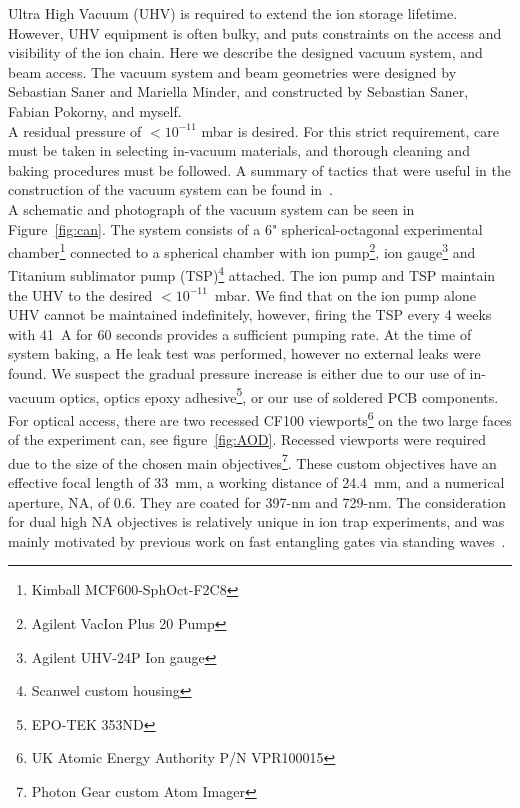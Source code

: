     Ultra High Vacuum (UHV) is required to extend the ion storage lifetime.
    However, UHV equipment is often bulky, and puts constraints on the access
    and visibility of the ion chain. Here we describe the designed vacuum
    system, and beam access.  The vacuum system and beam geometries were
    designed by Sebastian Saner and Mariella Minder, and constructed by
    Sebastian Saner, Fabian Pokorny, and myself.\\
    A residual pressure of $<10^{-11}$ mbar is desired. For this strict
    requirement, care must be taken in selecting in-vacuum materials, and 
    thorough cleaning and baking procedures must be followed. A summary of tactics that were
    useful in the construction of the vacuum system can be found
    in~\cite{birnbaum_ultra-high_2005, wolf_cryogenic_2019}.\\
    A schematic and photograph of the vacuum system can be seen in
    Figure~\ref{fig:can}. The system consists of a 6" spherical-octagonal
    experimental chamber\footnote{Kimball MCF600-SphOct-F2C8} connected to a
    spherical chamber with ion pump\footnote{Agilent VacIon Plus 20 Pump}, ion
    gauge\footnote{Agilent UHV-24P Ion gauge} and Titanium sublimator pump
    (TSP)\footnote{Scanwel custom housing} attached. The ion pump and TSP
    maintain the UHV to the desired $<10^{-11}$~mbar. We find that on the ion
    pump alone UHV cannot be maintained indefinitely, however, firing the TSP
    every 4 weeks with 41~A for 60 seconds provides a sufficient pumping rate.
    At the time of system baking, a He leak test was performed, however 
    no external leaks were found. We suspect the gradual pressure increase is either due
    to our use of in-vacuum optics, optics epoxy adhesive\footnote{EPO-TEK
    353ND}, or our use of soldered PCB components.\\
    For optical access, there are two recessed CF100 viewports\footnote{UK Atomic
    Energy Authority P/N VPR100015} on the two large faces of the experiment
    can, see figure~\ref{fig:AOD}. Recessed viewports were required due to the size of the chosen main
    objectives\footnote{Photon Gear custom Atom Imager}. These custom objectives
    have an effective focal length of 33~mm, a working distance of 24.4~mm, and
    a numerical aperture, NA, of 0.6. They are coated for 397-nm and 729-nm.
    The consideration for dual high NA objectives is relatively unique in ion trap experiments, and was mainly motivated by previous work on fast entangling gates via standing waves~\cite{saner_breaking_2023}. \\
